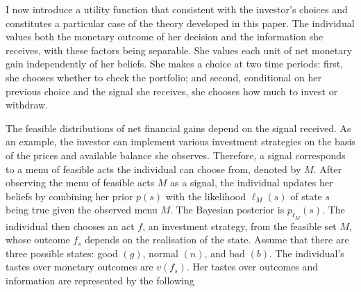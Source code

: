 \begin{comment}
			\hline
			{\color{blue}Outstanding} & \multirow{2}{*}{{\color{blue}\( i, n , \overline{w} \)}} \\
			{\color{blue}Good}        &                                                          \\
			Bad                       & \(  i, n, w \)                                           \\
		\end{tabular}
	\end{minipage}
	\caption{Information avoidance under negative prior beliefs, "ostrich effect".} %
	\label{tab:ostrich}
\end{table}

\end{comment}

I now introduce a utility function that consistent with the investor's choices and constitutes a particular case of the theory developed in this paper. The individual values both the monetary outcome of her decision and the information she receives, with these factors being separable. She values each unit of net monetary gain independently of her beliefs. She makes a choice at two time periods: first, she chooses whether to check the portfolio; and second, conditional on her previous choice and the signal she receives, she chooses how much to invest or withdraw.

The feasible distributions of net financial gains depend on the signal received. As an example, the investor can implement various investment strategies on the basis of the prices and available balance she observes. Therefore, a signal corresponds to a menu of feasible acts the individual can choose from, denoted by \( M \). After observing the menu of feasible acts \( M \) as a signal, the individual updates her beliefs by combining her prior \( p \left( s \right) \) with the likelihood \( \ell_{M} \left( s \right) \) of state \( s \) being true given the observed menu \( M \). The Bayesian posterior is \( p_{\ell_M} \left( s \right) \). The individual then chooses an act \( f \), an investment strategy, from the feasible set \( M \), whose outcome \( f_s \) depends on the realisation of the state. Assume that there are three possible states: good \( \left( g \right) \), normal \( \left( n \right) \), and bad \( \left( b \right) \). The individual's tastes over monetary outcomes are \( v \left( f_s \right) \). Her tastes over outcomes and information are represented by the following

